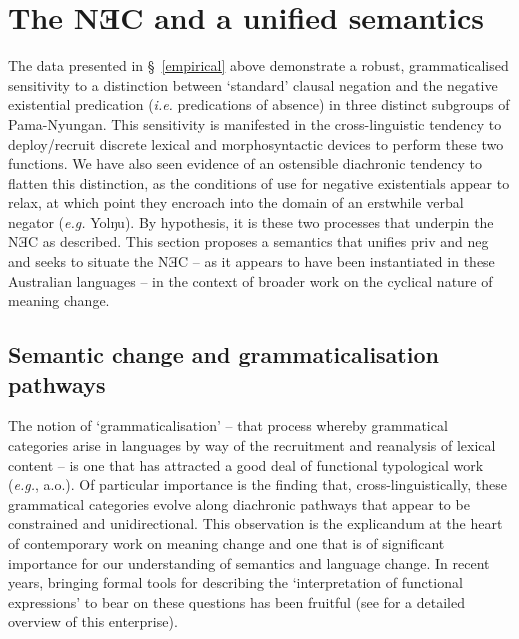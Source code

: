 \chapter{The NƎC and a unified semantics}\label{disc}\label{NEC2}



The data presented in \S~\ref{empirical} above demonstrate a robust, grammaticalised sensitivity to a distinction between `standard' clausal negation and the negative existential predication (\textit{i.e.} predications of absence) in three distinct subgroups of Pama-Nyungan. This sensitivity is manifested in the cross-linguistic tendency to deploy/recruit discrete lexical and morphosyntactic devices to perform these two functions. We have also seen evidence of an ostensible diachronic tendency to flatten this distinction, as the conditions of use for negative existentials appear to relax, at which point they encroach into the domain of an erstwhile verbal negator (\textit{e.g.} Yolŋu). By hypothesis, it is these two processes that underpin the NƎC as described. This section proposes a semantics that unifies \gls{priv} and \gls{neg} and seeks to situate the NƎC -- as it appears to have been instantiated in these Australian languages -- in the context of broader work on the cyclical nature of meaning change.

\section{Semantic change and grammaticalisation pathways}\label{disc-gram}


 


The notion of `grammaticalisation' -- that process whereby grammatical categories arise in languages by way of the recruitment and reanalysis of  lexical content -- is one that has attracted a good deal of functional typological work (\textit{e.g.}, \citealt{Bybee1994,Bybee1989,Traugott1980,Dahl1985,Heine2003} a.o.). Of particular importance is the finding that, cross-linguistically, these grammatical categories evolve along diachronic pathways that appear to be constrained and unidirectional. This observation is the explicandum at the heart of contemporary work on meaning change and one that is of significant importance for our understanding of semantics and language change. In recent years, bringing formal tools for describing the `interpretation of functional expressions' to bear on these questions has been fruitful (see \citealt{Deo2015} for a detailed overview of this enterprise). %


